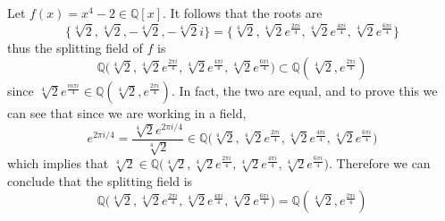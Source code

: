   \begin{example}
    Let $f(x) = x^4 - 2 \in \mathbb{Q}[x]$. It follows that the roots are 
    \begin{equation}
      \{ \sqrt[4]{2}, \sqrt[4]{2}, -\sqrt[4]{2}, - \sqrt[4]{2} i \} = \Big\{ \sqrt[4]{2}, \sqrt[4]{2} e^{\frac{2\pi i}{4}}, \sqrt[4]{2} e^{\frac{4\pi i}{4}}, \sqrt[4]{2} e^{\frac{6\pi i}{4}} \Big\}
    \end{equation}
    thus the splitting field of $f$ is 
    \begin{equation}
      \mathbb{Q} \big( \sqrt[4]{2}, \sqrt[4]{2} e^{\frac{2\pi i}{4}}, \sqrt[4]{2} e^{\frac{4\pi i}{4}}, \sqrt[4]{2} e^{\frac{6\pi i}{4}} \big) \subset \mathbb{Q}(\sqrt[4]{2}, e^{\frac{2\pi i}{4}})
    \end{equation}
    since $\sqrt[4]{2} e^{\frac{m \pi i}{4}} \in \mathbb{Q}(\sqrt[4]{2}, e^{\frac{2\pi i}{4}})$. In fact, the two are equal, and to prove this we can see that since we are working in a field, 
    \begin{equation}
      e^{2 \pi i / 4} = \frac{\sqrt[4]{2} e^{2\pi i/4}}{\sqrt[4]{2}} \in \mathbb{Q} \big( \sqrt[4]{2}, \sqrt[4]{2} e^{\frac{2\pi i}{4}}, \sqrt[4]{2} e^{\frac{4\pi i}{4}}, \sqrt[4]{2} e^{\frac{6\pi i}{4}} \big) 
    \end{equation}
    which implies that $\sqrt[4]{2} \in \mathbb{Q} \big( \sqrt[4]{2}, \sqrt[4]{2} e^{\frac{2\pi i}{4}}, \sqrt[4]{2} e^{\frac{4\pi i}{4}}, \sqrt[4]{2} e^{\frac{6\pi i}{4}} \big)$. Therefore we can conclude that the splitting field is 
    \begin{equation}
      \mathbb{Q} \big( \sqrt[4]{2}, \sqrt[4]{2} e^{\frac{2\pi i}{4}}, \sqrt[4]{2} e^{\frac{4\pi i}{4}}, \sqrt[4]{2} e^{\frac{6\pi i}{4}} \big) = \mathbb{Q}(\sqrt[4]{2}, e^{\frac{2\pi i}{4}})
    \end{equation}
  \end{example} 
